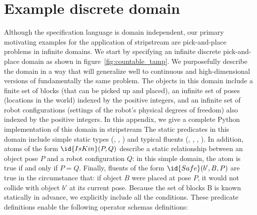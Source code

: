 \documentclass[letterpaper]{article} %
\theoremstyle{plain}\newtheorem{thm}{Theorem}
\theoremstyle{definition}\newtheorem{defn}{Definition}
\theoremstyle{plain}\newtheorem{lem}{Lemma}
\theoremstyle{plain}\newtheorem{cor}{Corollary}
\newcommand{\algname}{{\sc strips}tream}
\begin{document}



\section{Example discrete domain}

Although the specification language is domain independent, our primary
motivating examples for the application of \algname{} are 
pick-and-place problems in infinite domains.  
We start by specifying an infinite discrete pick-and-place domain as shown in figure~\ref{fig:countable_tamp}.
We purposefully describe the domain in a way that will generalize well
to continuous and high-dimensional versions of fundamentally the same
problem.  The objects in this domain include a finite set of blocks
(that can be picked up and placed), an infinite set of poses
(locations in the world) indexed by the positive integers, and an
infinite set of robot configurations (settings of the robot's physical
degrees of freedom) also indexed by the positive integers.  
In this appendix, we give a complete Python implementation of this domain in \algname{}
The static predicates in this domain include simple static types (,
, ) and typical fluents (,
, , ).  In addition, atoms of the form
$\id{IsKin}(P, Q)$ describe a static relationship between an object pose
$P$ and a robot configuration $Q$:  in this simple domain, the atom is
true if and only if $P = Q$.  Finally, fluents of the form
$\id{Safe}(b', B, P)$ are true in the circumstance that: if object $B$ were
placed at pose $P$, it would not collide with object $b'$ at its
current pose.  Because the set of blocks {\cal B} is known statically
in advance, we explicitly include all the  conditions.
These predicate definitions enable the following operator schemas definitions:
\end{document}
